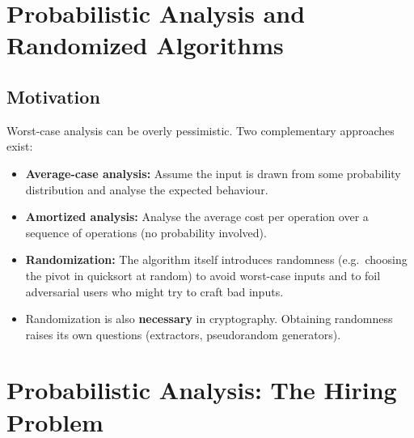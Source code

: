 
\section*{Probabilistic Analysis and Randomized Algorithms}

\subsection{Motivation}

Worst-case analysis can be overly pessimistic. Two complementary approaches exist:

\begin{itemize}[noitemsep]
  \item \textbf{Average-case analysis:} Assume the input is drawn from some probability
        distribution and analyse the expected behaviour.
  \item \textbf{Amortized analysis:} Analyse the average cost per operation over a sequence
        of operations (no probability involved).
  \item \textbf{Randomization:} The algorithm itself introduces randomness (e.g.\ choosing
        the pivot in quicksort at random) to avoid worst-case inputs and to foil adversarial
        users who might try to craft bad inputs.
  \item Randomization is also \textbf{necessary} in cryptography. Obtaining randomness raises
        its own questions (extractors, pseudorandom generators).
\end{itemize}

\section*{Probabilistic Analysis: The Hiring Problem}

